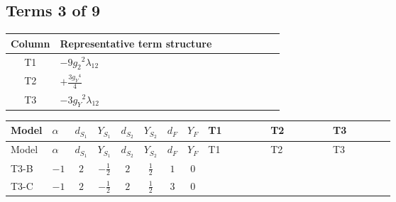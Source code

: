 \documentclass[8pt]{article}
\begin{document}
\begin{landscape}
\subsection*{Terms 3 of 9}
\begin{center}
\begin{tabular}{@{}c >{\raggedright\arraybackslash}p{0.82\linewidth}@{}}
\toprule
Column & Representative term structure \\
\midrule
T1 & \(\displaystyle -9 {g_2}^2 {\lambda_{12}}\) \\
\midrule
T2 & \(\displaystyle +\frac{3 {g_Y}^4}{4}\) \\
\midrule
T3 & \(\displaystyle -3 {g_Y}^2 {\lambda_{12}}\) \\
\midrule
\bottomrule
\end{tabular}
\end{center}
\smallskip
\tiny
\begin{longtable}{@{}llcccccc >{\raggedright\arraybackslash}p{0.21\linewidth} >{\raggedright\arraybackslash}p{0.21\linewidth} >{\raggedright\arraybackslash}p{0.21\linewidth}@{}}
\toprule
Model & $\alpha$ & $d_{S_1}$ & $Y_{S_1}$ & $d_{S_2}$ & $Y_{S_2}$ & $d_F$ & $Y_F$ & T1 & T2 & T3 \\
\midrule
\endfirsthead
\toprule
Model & $\alpha$ & $d_{S_1}$ & $Y_{S_1}$ & $d_{S_2}$ & $Y_{S_2}$ & $d_F$ & $Y_F$ & T1 & T2 & T3 \\
\midrule
\endhead
T3-B & $-1$ & $2$ & $-\frac{1}{2}$ & $2$ & $\frac{1}{2}$ & $1$ & $0$ & \scriptsize\adjustbox{max width=\linewidth}{$\begin{gathered} -9 {g_2}^2 {\lambda_{12}}\end{gathered}$} & \scriptsize\adjustbox{max width=\linewidth}{$\begin{gathered} +\frac{3 {g_Y}^4}{4}\end{gathered}$} & \scriptsize\adjustbox{max width=\linewidth}{$\begin{gathered} -3 {g_Y}^2 {\lambda_{12}}\end{gathered}$} \\
\midrule
T3-C & $-1$ & $2$ & $-\frac{1}{2}$ & $2$ & $\frac{1}{2}$ & $3$ & $0$ & \scriptsize\adjustbox{max width=\linewidth}{$\begin{gathered} -9 {g_2}^2 {\lambda_{12}}\end{gathered}$} & \scriptsize\adjustbox{max width=\linewidth}{$\begin{gathered} +\frac{3 {g_Y}^4}{4}\end{gathered}$} & \scriptsize\adjustbox{max width=\linewidth}{$\begin{gathered} -3 {g_Y}^2 {\lambda_{12}}\end{gathered}$} \\

\end{longtable}
\end{landscape}
\end{document}
